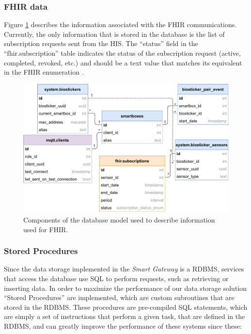 \subsubsection{\acs{FHIR} data}

Figure \ref{fig:wow-dbschema-fhir} describes the information associated with the \acs{FHIR} communications. Currently, the only information that is stored in the database is the list of subscription requests sent from the \acs{HIS}. The ``status'' field in the ``fhir.subscription'' table indicates the status of the subscription request (active, completed, revoked, etc.) and should be a text value that matches its equivalent in the \acs{FHIR} enumeration \cite{fhir}.

\begin{figure}[H]
    \centering
    \includegraphics[width=0.66\linewidth]{images/database-schema-fhir.pdf}
    \caption{Components of the database model used to describe information used for \acs{FHIR}.}
    \label{fig:wow-dbschema-fhir}
\end{figure}

\subsubsection{Stored Procedures}

Since the data storage implemented in the \textit{Smart Gateway} is a \acs{RDBMS}, services that access the database use \acf{SQL} to perform requests, such as retrieving or inserting data. In order to maximize the performance of our data storage solution ``Stored Procedures'' are implemented, which are custom subroutines that are stored in the \acs{RDBMS}. These procedures are pre-compiled \acs{SQL} statements, which are simply a set of instructions that perform a given task, that are defined in the \acs{RDBMS}, and can greatly improve the performance of these systems since these:

